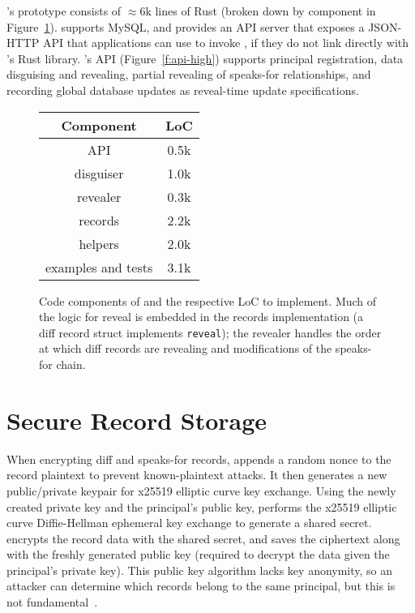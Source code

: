 
\sys's prototype consists of $\approx6$k lines of Rust (broken down by component in
Figure~\ref{f:loc}). 
%
\sys supports MySQL, and provides an API server that exposes a JSON-HTTP API that applications
can use to invoke \sys, if they do not link directly with \sys's Rust library.
%
\sys's API (Figure~\ref{f:api-high}) supports principal registration, data disguising and revealing,
partial revealing of speaks-for relationships, and recording global database
updates as reveal-time update specifications.
%

\begin{figure}[h]
\centering
\begin{tabular}{cc}
    \textbf{Component} & \textbf{LoC} \\
\hline
    API & 0.5k\\
    disguiser & 1.0k\\
    revealer & 0.3k \\
    records & 2.2k \\
    helpers & 2.0k \\
    examples and tests & 3.1k\\

\end{tabular}
    \caption[\sys's code components and LoC.]{Code components of \sys and the respective LoC to implement. Much
    of the logic for reveal is embedded in the records implementation (\eg a
    diff record struct implements \texttt{reveal}); the revealer handles the
    order at which diff records are revealing and modifications of the speaks-for
    chain.} 
    \label{f:loc}
\end{figure}

%


\section{Secure Record Storage}
%
When encrypting diff and speaks-for records, \sys appends a random nonce to
the record plaintext to prevent known-plaintext attacks.
%
It then generates a new public/private keypair for x25519 elliptic curve key
exchange.
%
Using the newly created private key and the principal's public key, \sys
performs the x25519 elliptic curve Diffie-Hellman ephemeral key exchange to
generate a shared secret.
%
\sys encrypts the record data with the shared secret, and saves the
ciphertext along with the freshly generated public key (required to decrypt
the data given the principal's private key).
%
This public key algorithm lacks key anonymity, so an attacker can determine
which records belong to the same principal, but this is not
fundamental~\cite{anonymous-keys}.

